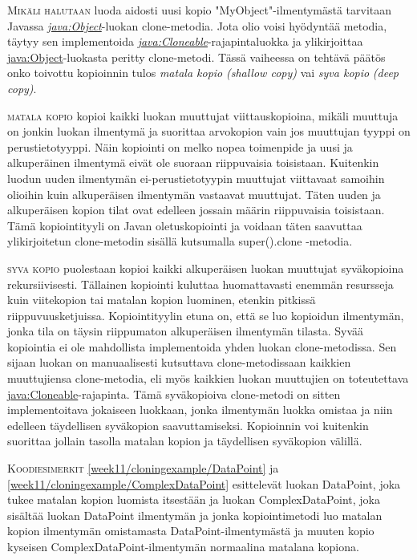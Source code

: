 \documentclass[openany]{book}
\newcommand{\newthought}[1]{\smallskip\textsc{#1}}
\newcommand{\eng}[1]{\textit{(#1)}}
\newcommand{\new}[1]{\textit{\gls{#1}}}
\newcommand{\neweng}[2]{\new{#1} \eng{#2}}
\newcommand{\java}[1]{\underline{\gls{java:#1}}}
\newcommand{\newjava}[1]{\textit{\java{#1}}}
\begin{document}
\newthought{Mikäli halutaan} luoda aidosti uusi kopio "MyObject"-ilmentymästä tarvitaan Javassa
\newjava{Object}-luokan clone-metodia. Jota olio voisi hyödyntää metodia, täytyy sen implementoida
\newjava{Cloneable}-rajapintaluokka ja ylikirjoittaa \java{Object}-luokasta peritty clone-metodi.
Tässä vaiheessa on tehtävä päätös onko toivottu kopioinnin tulos \neweng{matala kopio}{shallow
copy} vai \neweng{syva kopio}{deep copy}. 

\newthought{\Gls{matala kopio}} kopioi kaikki luokan muuttujat viittauskopioina, mikäli muuttuja
on jonkin luokan ilmentymä ja suorittaa arvokopion vain jos muuttujan tyyppi on perustietotyyppi.
Näin kopiointi on melko nopea toimenpide ja uusi ja alkuperäinen ilmentymä eivät ole suoraan
riippuvaisia toisistaan. Kuitenkin luodun uuden ilmentymän ei-perustietotyypin muuttujat
viittavaat samoihin olioihin kuin alkuperäisen ilmentymän vastaavat muuttujat. Täten uuden ja
alkuperäisen kopion tilat ovat edelleen jossain määrin riippuvaisia toisistaan. Tämä
kopiointityyli on Javan oletuskopiointi ja voidaan täten saavuttaa ylikirjoitetun clone-metodin
sisällä kutsumalla super().clone -metodia.

\newthought{\Gls{syva kopio}} puolestaan kopioi kaikki alkuperäisen luokan muuttujat syväkopioina
rekursiivisesti. Tällainen kopiointi kuluttaa huomattavasti enemmän resursseja kuin viitekopion
tai matalan kopion luominen, etenkin pitkissä riippuvuusketjuissa. Kopiointityylin etuna on, että
se luo kopioidun ilmentymän, jonka tila on täysin riippumaton alkuperäisen ilmentymän tilasta.
Syvää kopiointia ei ole mahdollista implementoida yhden luokan clone-metodissa. Sen sijaan luokan
on manuaalisesti kutsuttava clone-metodissaan kaikkien muuttujiensa clone-metodia, eli myös
kaikkien luokan muuttujien on toteutettava \java{Cloneable}-rajapinta. Tämä syväkopioiva
clone-metodi on sitten implementoitava jokaiseen luokkaan, jonka ilmentymän luokka omistaa ja niin
edelleen täydellisen syväkopion saavuttamiseksi. Kopioinnin voi kuitenkin suorittaa jollain
tasolla matalan kopion ja täydellisen syväkopion välillä.

\newthought{Koodiesimerkit} \ref{week11/cloningexample/DataPoint} ja
\ref{week11/cloningexample/ComplexDataPoint} esittelevät luokan DataPoint, joka tukee matalan
kopion luomista itsestään ja luokan ComplexDataPoint, joka sisältää luokan DataPoint ilmentymän ja
jonka kopiointimetodi luo matalan kopion ilmentymän omistamasta DataPoint-ilmentymästä ja muuten
kopio kyseisen ComplexDataPoint-ilmentymän normaalina matalana kopiona.
\end{document}
